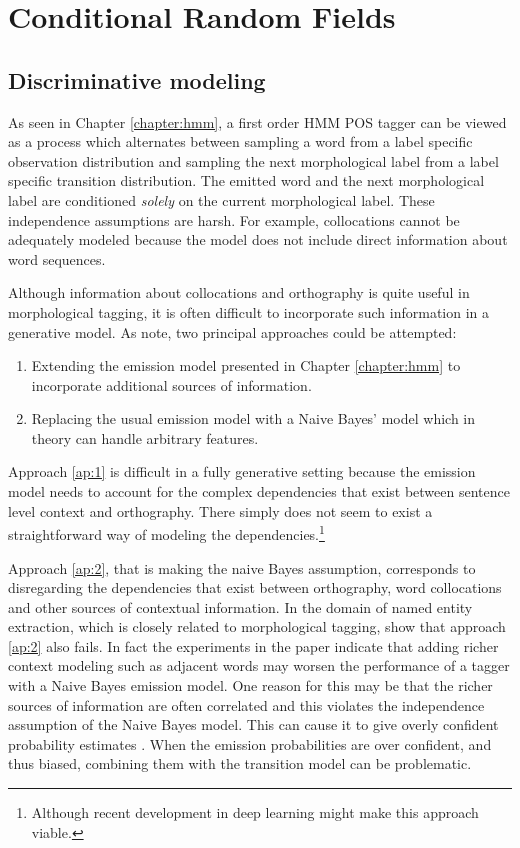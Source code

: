 \chapter{Conditional Random Fields}
\label{chapter:crf}
\section{Discriminative modeling}

As seen in Chapter \ref{chapter:hmm}, a first order HMM POS tagger can
be viewed as a process which alternates between sampling a word from a
label specific observation distribution and sampling the next
morphological label from a label specific transition distribution. The
emitted word and the next morphological label are conditioned {\it
  solely} on the current morphological label. These independence
assumptions are harsh. For example, collocations cannot be adequately
modeled because the model does not include direct information about
word sequences.

Although information about collocations and orthography is quite
useful in morphological tagging, it is often difficult to incorporate
such information in a generative model. As \cite{Sutton2012} note, two
principal approaches could be attempted:
\begin{enumerate}
\item Extending the emission model presented in Chapter
  \ref{chapter:hmm} to incorporate additional sources of
  information.\label{ap:1}
\item Replacing the usual emission model with a Naive
  Bayes' model which in theory can handle arbitrary
  features.\label{ap:2}
\end{enumerate}

Approach \ref{ap:1} is difficult in a fully generative setting because the
emission model needs to account for the complex dependencies that
exist between sentence level context and orthography. There simply does not
seem to exist a straightforward way of modeling the dependencies.\footnote{Although recent development in deep learning might make this approach viable.}

Approach \ref{ap:2}, that is making the naive Bayes assumption,
corresponds to disregarding the dependencies that exist between
orthography, word collocations and other sources of contextual
information. In the domain of named entity extraction, which is
closely related to morphological tagging, \cite{Ruokolainen2013} show
that approach \ref{ap:2} also fails. In fact the experiments in the
paper indicate that adding richer context modeling such as adjacent
words may worsen the performance of a tagger with a Naive Bayes
emission model. One reason for this may be that the richer sources of
information are often correlated and this violates the independence
assumption of the Naive Bayes model. This can cause it to give overly
confident probability estimates \citep{Sutton2012}. When the emission
probabilities are over confident, and thus biased, combining them with
the transition model can be problematic.


